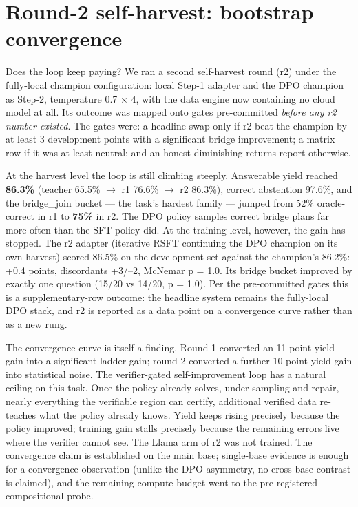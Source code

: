 \section{Round-2 self-harvest: bootstrap convergence}\label{sec:round-2-self-harvest-bootstrap-convergen}

Does the loop keep paying? We ran a second self-harvest round (r2) under the fully-local
champion configuration: local Step-1 adapter and the DPO champion as Step-2, temperature
0.7 $\times$ 4, with the data engine now containing no cloud model at all. Its outcome was mapped
onto gates pre-committed \emph{before any r2 number existed}. The gates were: a headline swap only
if r2 beat the champion by at least 3 development points with a significant bridge
improvement; a matrix row if it was at least neutral; and an honest diminishing-returns report
otherwise.

At the harvest level the loop is still climbing steeply. Answerable yield reached \textbf{86.3\%}
(teacher 65.5\% $\rightarrow$ r1 76.6\% $\rightarrow$ r2 86.3\%), correct abstention 97.6\%, and the bridge\_join bucket ---
the task's hardest family --- jumped from 52\% oracle-correct in r1 to \textbf{75\%} in r2. The DPO
policy samples correct bridge plans far more often than the SFT policy did. At the training
level, however, the gain has stopped. The r2 adapter (iterative RSFT continuing the DPO
champion on its own harvest) scored 86.5\% on the development set against the champion's 86.2\%:
+0.4 points, discordants +3/--2, McNemar p = 1.0. Its bridge bucket improved by exactly one
question (15/20 vs 14/20, p = 1.0). Per the pre-committed gates this is a supplementary-row
outcome: the headline system remains the fully-local DPO stack, and r2 is reported as a data
point on a convergence curve rather than as a new rung.

The convergence curve is itself a finding. Round 1 converted an 11-point yield gain into a
significant ladder gain; round 2 converted a further 10-point yield gain into statistical
noise. The verifier-gated self-improvement loop has a natural ceiling on this task. Once the
policy already solves, under sampling and repair, nearly everything the verifiable region can
certify, additional verified data re-teaches what the policy already knows. Yield keeps rising
precisely because the policy improved; training gain stalls precisely because the remaining
errors live where the verifier cannot see. The Llama arm of r2 was not trained. The
convergence claim is established on the main base; single-base evidence is enough for a
convergence observation (unlike the DPO asymmetry, no cross-base contrast is claimed), and the
remaining compute budget went to the pre-registered compositional probe.

